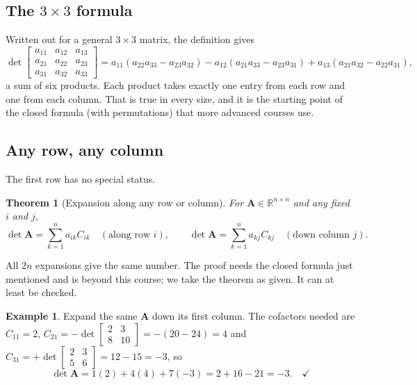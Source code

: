 \documentclass[11pt]{article}
\theoremstyle{plain}
\newtheorem{thm}{Theorem}[section]
\theoremstyle{definition}
\newtheorem{ex}{Example}[section]
\theoremstyle{remark}
\newcommand{\R}{\mathbb{R}}
\newcommand{\mt}[1]{\mathbf{#1}}
\begin{document}
\subsection{The \texorpdfstring{$3\times3$}{3x3} formula}
Written out for a general $3\times3$ matrix, the definition gives
\[
  \det\begin{bmatrix}a_{11}&a_{12}&a_{13}\\a_{21}&a_{22}&a_{23}\\a_{31}&a_{32}&a_{33}\end{bmatrix}
  =a_{11}(a_{22}a_{33}-a_{23}a_{32})
   -a_{12}(a_{21}a_{33}-a_{23}a_{31})
   +a_{13}(a_{21}a_{32}-a_{22}a_{31}),
\]
a sum of six products. Each product takes exactly one entry from each row and
one from each column. That is true in every size, and it is the starting point of
the closed formula (with permutations) that more advanced courses use.

\subsection{Any row, any column}
The first row has no special status.

\begin{thm}[Expansion along any row or column]
\label{thm:anyrow}
For $\mt{A}\in\R^{n\times n}$ and any fixed $i$ and $j$,
\[
  \det\mt{A}=\sum_{k=1}^{n}a_{ik}C_{ik}
  \quad(\text{along row } i),
  \qquad
  \det\mt{A}=\sum_{k=1}^{n}a_{kj}C_{kj}
  \quad(\text{down column } j).
\]
\end{thm}

\noindent All $2n$ expansions give the same number. The proof needs the closed
formula just mentioned and is beyond this course; we take the theorem as given.
It can at least be checked.

\begin{ex}
Expand the same $\mt{A}$ down its first column. The cofactors needed are
$C_{11}=2$,
$C_{21}=-\det\begin{bmatrix}2&3\\8&10\end{bmatrix}=-(20-24)=4$ and
$C_{31}=+\det\begin{bmatrix}2&3\\5&6\end{bmatrix}=12-15=-3$, so
\[
  \det\mt{A}=1(2)+4(4)+7(-3)=2+16-21=-3 . \quad\checkmark
\]
\end{ex}
\end{document}
